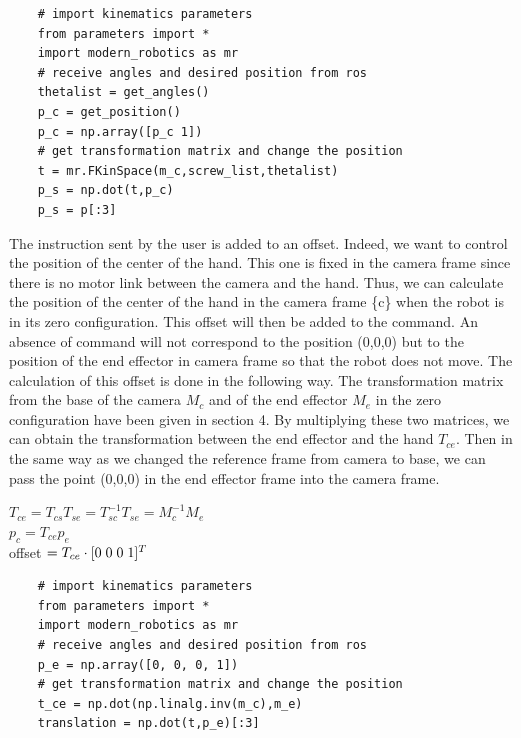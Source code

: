 \bigbreak
\begin{verbatim}
    # import kinematics parameters
    from parameters import * 
    import modern_robotics as mr
    # receive angles and desired position from ros 
    thetalist = get_angles()
    p_c = get_position()
    p_c = np.array([p_c 1])
    # get transformation matrix and change the position
    t = mr.FKinSpace(m_c,screw_list,thetalist)
    p_s = np.dot(t,p_c)
    p_s = p[:3]
\end{verbatim}

\bigbreak
The instruction sent by the user is added to an offset. Indeed, we want to control the position of the center of the hand. This one is fixed in the camera frame since there is no motor link between the camera and the hand. Thus, we can calculate the position of the center of the hand in the camera frame \{c\} when the robot is in its zero configuration. This offset will then be added to the command. An absence of command will not correspond to the position (0,0,0) but to the position of the end effector in camera frame so that the robot does not move. The calculation of this offset is done in the following way. The transformation matrix from the base of the camera $M_c$ and of the end effector $M_e$ in the zero configuration have been given in section 4. By multiplying these two matrices, we can obtain the transformation between the end effector and the hand $T_{ce}$. Then in the same way as we changed the reference frame from camera to base, we can pass the point (0,0,0) in the end effector frame into the camera frame.

\begin{center}
    $T_{ce} = T_{cs}T_{se} =T_{sc}^{-1}T_{se}=M_c^{-1}M_e$\\
    $p_c = T_{ce}p_e$\\
    offset $= T_{ce}\cdot[0\hspace{0.1cm}0\hspace{0.1cm}0\hspace{0.1cm}1]^T$
\end{center}
\begin{verbatim}
    # import kinematics parameters
    from parameters import * 
    import modern_robotics as mr
    # receive angles and desired position from ros 
    p_e = np.array([0, 0, 0, 1])
    # get transformation matrix and change the position
    t_ce = np.dot(np.linalg.inv(m_c),m_e)
    translation = np.dot(t,p_e)[:3]
\end{verbatim}


